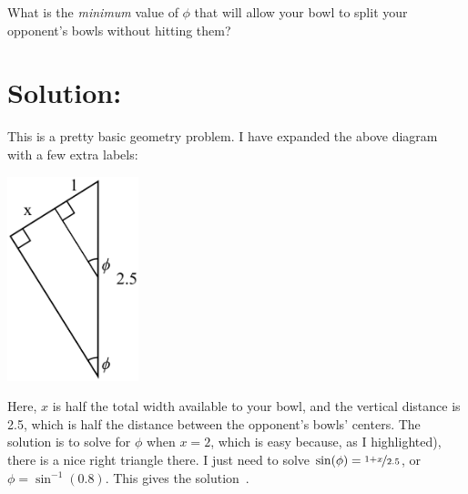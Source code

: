 \documentclass{article}
\begin{document}
What is the \textit{minimum} value of $\phi$ that will allow your bowl to split your opponent's bowls without hitting them?

\section*{Solution:}

This is a pretty basic geometry problem.
I have expanded the above diagram with a few extra labels:

\vspace{0.15in}
\begin{center}
\includegraphics[width=1.5in]{bowls_diagram2.png}
\end{center}
\vspace{0.15in}

Here, $x$ is half the total width available to your bowl, and the vertical distance is 2.5, which is half the distance between the opponent's bowls' centers.
The solution is to solve for $\phi$ when $x=2$, which is easy because, as I highlighted), there is a nice right triangle there.
I just need to solve $\sin(\phi)=\nicefrac{1+x}{2.5}$, or $\phi=\sin^{-1}(0.8)$.
This gives the solution
\,.
\end{document}

